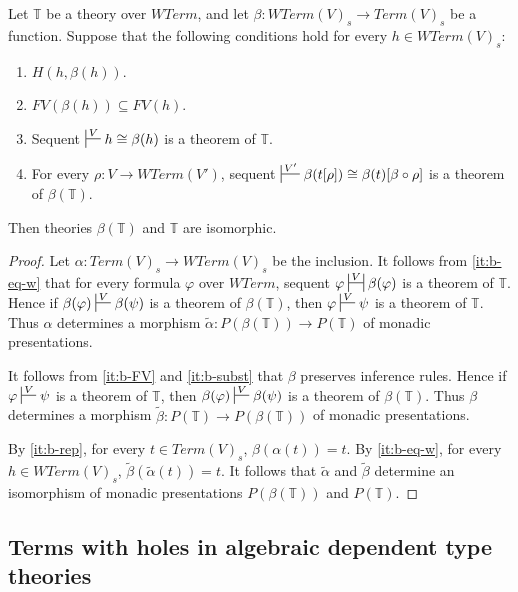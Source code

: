 \documentclass[reqno]{amsart}
\theoremstyle{definition}
\theoremstyle{remark}
\numberwithin{figure}{section}
\begin{document}
\begin{prop}
Let $\mathbb{T}$ be a theory over $WTerm$, and let $\beta : WTerm(V)_s \to Term(V)_s$ be a function.
Suppose that the following conditions hold for every $h \in WTerm(V)_s$:
\begin{enumerate}
\item \label{it:b-rep} $H(h,\beta(h))$.
\item \label{it:b-FV} $FV(\beta(h)) \subseteq FV(h)$.
\item \label{it:b-eq-w} Sequent $\sststile{}{V} h \cong \beta(h)$ is a theorem of $\mathbb{T}$.
\item \label{it:b-subst} For every $\rho : V \to WTerm(V')$, sequent $\sststile{}{V'} \beta(t[\rho]) \cong \beta(t)[\beta \circ \rho]$ is a theorem of $\beta(\mathbb{T})$.
\end{enumerate}
Then theories $\beta(\mathbb{T})$ and $\mathbb{T}$ are isomorphic.
\end{prop}
\begin{proof}
Let $\alpha : Term(V)_s \to WTerm(V)_s$ be the inclusion.
It follows from \eqref{it:b-eq-w} that for every formula $\varphi$ over $WTerm$, sequent $\varphi \ssststile{}{V} \beta(\varphi)$ is a theorem of $\mathbb{T}$.
Hence if $\beta(\varphi) \sststile{}{V} \beta(\psi)$ is a theorem of $\beta(\mathbb{T})$, then $\varphi \sststile{}{V} \psi$ is a theorem of $\mathbb{T}$.
Thus $\alpha$ determines a morphism $\widetilde{\alpha} : P(\beta(\mathbb{T})) \to P(\mathbb{T})$ of monadic presentations.

It follows from \eqref{it:b-FV} and \eqref{it:b-subst} that $\beta$ preserves inference rules.
Hence if $\varphi \sststile{}{V} \psi$ is a theorem of $\mathbb{T}$, then $\beta(\varphi) \sststile{}{V} \beta(\psi)$ is a theorem of $\beta(\mathbb{T})$.
Thus $\beta$ determines a morphism $\widetilde{\beta} : P(\mathbb{T}) \to P(\beta(\mathbb{T}))$ of monadic presentations.

By \eqref{it:b-rep}, for every $t \in Term(V)_s$, $\beta(\alpha(t)) = t$.
By \eqref{it:b-eq-w}, for every $h \in WTerm(V)_s$, $\widetilde{\beta}(\widetilde{\alpha}(t)) = t$.
It follows that $\widetilde{\alpha}$ and $\widetilde{\beta}$ determine an isomorphism of monadic presentations $P(\beta(\mathbb{T}))$ and $P(\mathbb{T})$.
\end{proof}

\subsection{Terms with holes in algebraic dependent type theories}
\end{document}
